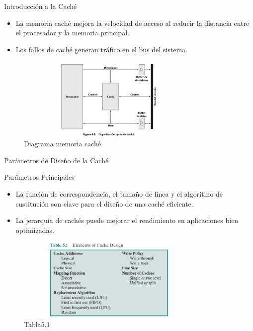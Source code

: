 \documentclass[presentation]{beamer}
\begin{document}
\begin{frame}[label={sec:orga06071d}]{Introducción a la Caché}
\begin{itemize}
\item La memoria caché mejora la velocidad de acceso al reducir la distancia entre el procesador y la memoria principal.
\item Los fallos de caché generan tráfico en el bus del sistema.
\end{itemize}

\begin{figure}[!h]
   \vspace{-0.1cm}
   \centering
   \includegraphics[height=4cm, width=0.8\textwidth]{./Imagenes/fig4.6.png}
   \vspace{-0.5cm} %
   \caption{Diagrama memoria caché}
   \label{fig:Representacion}
\end{figure}
\end{frame}

\begin{frame}[label={sec:org6829391}]{Parámetros de Diseño de la Caché}
\begin{block}{Parámetros Principales}
\begin{itemize}
\item La función de correspondencia, el tamaño de línea y el algoritmo de sustitución son clave para el diseño de una caché eficiente.
\item La jerarquía de cachés puede mejorar el rendimiento en aplicaciones bien optimizadas.
\end{itemize}

\begin{figure}[!h]
   \vspace{-0.1cm}
   \centering
   \includegraphics[height=4cm, width=0.8\textwidth]{./Imagenes/tabla5.1.png}
   \vspace{-0.5cm} %
   \caption{Tabla5.1}
   \label{fig:Representacion}
\end{figure}
\end{block}
\end{frame}
\end{document}
